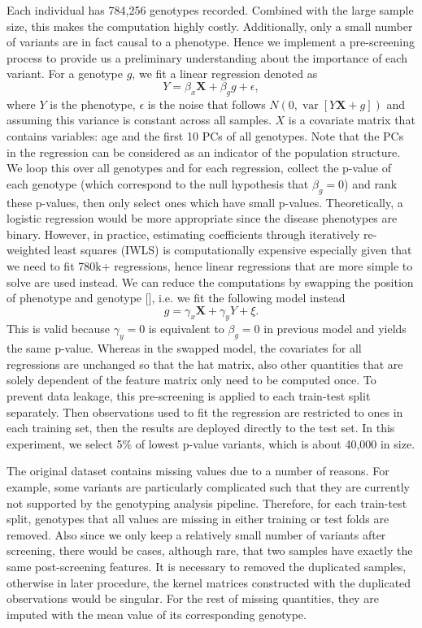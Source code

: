 \documentclass[a4paper,12pt]{article}
\begin{document}
Each individual has 784,256 genotypes recorded. Combined with the large sample size, this makes the computation highly costly. Additionally, only a small number of variants are in fact causal to a phenotype. Hence we implement a pre-screening process to provide us a preliminary understanding about the importance of each variant. For a genotype $g$, we fit a linear regression denoted as $$Y=\beta_{x} \mathbf{X}+\beta_{g} g+\epsilon,$$ where $Y$ is the phenotype, $\epsilon$ is the noise that follows $N(0, \operatorname{var}[Y \mathbf{X}+g])$ and assuming this variance is constant across all samples. $X$ is a covariate matrix that contains variables: age and the first 10 PCs of all genotypes. Note that the PCs in the regression can be considered as an indicator of the population structure. We loop this over all genotypes and for each regression, collect the p-value of each genotype (which correspond to the null hypothesis that $\beta_{g}=0$) and rank these p-values, then only select ones which have small p-values. Theoretically, a logistic regression would be more appropriate since the disease phenotypes are binary. However, in practice, estimating coefficients through iteratively re-weighted least squares (IWLS) is computationally expensive especially given that we need to fit 780k+ regressions, hence linear regressions that are more simple to solve are used instead. We can reduce the computations by swapping the position of phenotype and genotype [\cite{voorman2012fast}], i.e. we fit the following model instead $$g=\gamma_{x} \mathbf{X}+\gamma_{y} Y+\xi.$$ This is valid because $\gamma_{y}=0$ is equivalent to $\beta_{g}=0$ in previous model and yields the same p-value. Whereas in the swapped model, the covariates for all regressions are unchanged so that the hat matrix, also other quantities that are solely dependent of the feature matrix only need to be computed once. To prevent data leakage, this pre-screening is applied to each train-test split separately. Then observations used to fit the regression are restricted to ones in each training set, then the results are deployed directly to the test set. In this experiment, we select 5\% of lowest p-value variants, which is about 40,000 in size.

The original dataset contains missing values due to a number of reasons.  For example, some variants are particularly complicated such that they are currently not supported by the genotyping analysis pipeline. Therefore, for each train-test split, genotypes that all values are missing in either training or test folds are removed. Also since we only keep a relatively small number of variants after screening, there would be cases, although rare, that two samples have exactly the same post-screening features. It is necessary to removed the duplicated samples, otherwise in later procedure, the kernel matrices constructed with the duplicated observations would be singular. For the rest of missing quantities, they are imputed with the mean value of its corresponding genotype.
\end{document}
